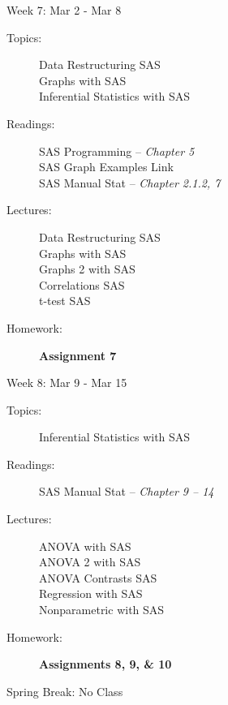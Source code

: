 \documentclass[11pt,article,oneside]{memoir}
\newcounter{schedule}
\begin{document}
\begin{schedule}{Week 7: Mar 2 - Mar 8}
\begin{description}
\item[Topics:] Data Restructuring SAS \\ Graphs with SAS \\ Inferential Statistics with SAS

\item[Readings:] SAS Programming -- \textit{Chapter 5} \\
                 SAS Graph Examples Link \\
                 SAS Manual Stat -- \textit{Chapter 2.1.2, 7}

\item[Lectures:] Data Restructuring SAS \\ Graphs with SAS \\ Graphs 2 with SAS \\ Correlations SAS \\ t-test SAS

\item[Homework:] \textbf{Assignment 7}

\end{description}
\end{schedule}
\begin{schedule}{Week 8: Mar 9 - Mar 15}
\begin{description}
\item[Topics:] Inferential Statistics with SAS

\item[Readings:] SAS Manual Stat -- \textit{Chapter 9 -- 14}

\item[Lectures:] ANOVA with SAS \\ ANOVA 2 with SAS \\ ANOVA Contrasts SAS \\ Regression with SAS \\ Nonparametric with SAS

\item[Homework:] \textbf{Assignments 8, 9, \& 10} 

\end{description}
\end{schedule}
\begin{schedule}{Spring Break: No Class}

\end{schedule}
\end{document}

